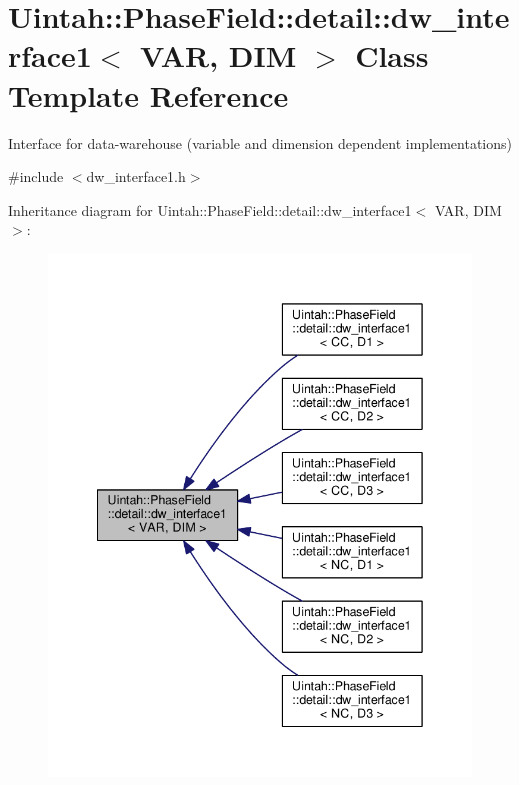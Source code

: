 \hypertarget{classUintah_1_1PhaseField_1_1detail_1_1dw__interface1}{}\section{Uintah\+:\+:Phase\+Field\+:\+:detail\+:\+:dw\+\_\+interface1$<$ V\+AR, D\+IM $>$ Class Template Reference}
\label{classUintah_1_1PhaseField_1_1detail_1_1dw__interface1}


Interface for data-\/warehouse (variable and dimension dependent implementations)  




{\ttfamily \#include $<$dw\+\_\+interface1.\+h$>$}



Inheritance diagram for Uintah\+:\+:Phase\+Field\+:\+:detail\+:\+:dw\+\_\+interface1$<$ V\+AR, D\+IM $>$\+:\nopagebreak
\begin{figure}[H]
\begin{center}
\leavevmode
\includegraphics[width=342pt]{classUintah_1_1PhaseField_1_1detail_1_1dw__interface1__inherit__graph}
\end{center}
\end{figure}


